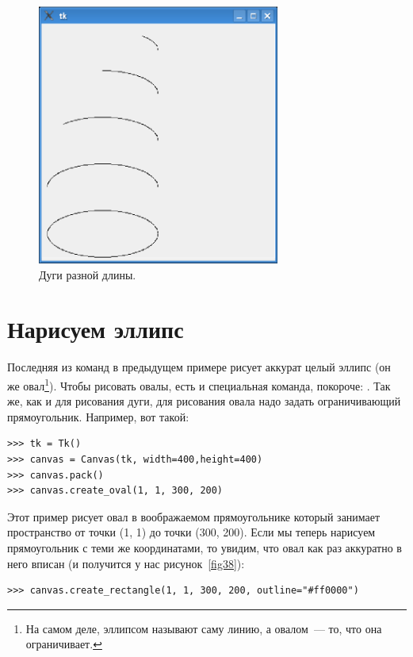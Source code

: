 \begin{figure}
\begin{center}
\includegraphics[width=80mm]{../en/figure37.eps}
\end{center}
\caption{Дуги разной длины.}\label{fig37}
\end{figure}

\section{Нарисуем эллипс}

Последняя из команд в предыдущем примере рисует аккурат целый эллипс (он же овал\footnote{На самом деле, эллипсом называют саму линию, а овалом — то, что она ограничивает.}). Чтобы рисовать овалы, есть и специальная команда, покороче: . Так же, как и для рисования дуги, для рисования овала надо задать ограничивающий прямоугольник. Например, вот такой:

\begin{listing}
\begin{verbatim}
>>> tk = Tk()
>>> canvas = Canvas(tk, width=400,height=400)
>>> canvas.pack()
>>> canvas.create_oval(1, 1, 300, 200)
\end{verbatim}
\end{listing}

Этот пример рисует овал в воображаемом прямоугольнике который занимает пространство от точки (1, 1) до точки (300, 200). Если мы теперь нарисуем прямоугольник с теми же координатами, то увидим, что овал как раз аккуратно в него вписан (и получится у нас рисунок \ref{fig38}):

\begin{listing}
\begin{verbatim}
>>> canvas.create_rectangle(1, 1, 300, 200, outline="#ff0000")
\end{verbatim}
\end{listing}

